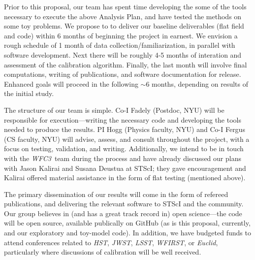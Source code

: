 \documentclass[12pt]{article}
\newcommand{\project}[1]{\textsl{#1}}
\newcommand{\HST}{\project{HST}}
\newcommand{\WFC}{\project{WFC3}}
\begin{document}
Prior to this proposal, our team has spent time developing the some of
the tools necessary to execute the above Analysis Plan, and have tested the
methods on some toy problems.  We propose to to deliver our baseline
deliverables (flat field and code) within 6 months of beginning the
project in earnest.  We envision a rough schedule of 1 month of data
collection/familiarization, in parallel with software development.
Next there will be roughly 4-5 months of interation and assessment of the
calibration algorithm.  Finally, the last month will involve final
computations, writing of publications, and software documentation for
release. Enhanced goals will proceed in the following $\sim6$ months,
depending on results of the initial study.

The structure of our team is simple.  Co-I Fadely (Postdoc, NYU) will
be responsible for execution---writing the necessary code and
developing the tools needed to produce the results.  PI Hogg (Physics
faculty, NYU) and Co-I Fergus (CS faculty, NYU) will advise, assess,
and consult throughout the project, with a focus on testing,
validation, and writing.  Additionally, we intend to be in touch with
the \WFC\ team during the process and have already discussed our plans
with Jason Kalirai and Susana Deustua at STScI; they gave
encouragement and Kalirai offered material assistance in the form of
flat testing (mentioned above).

The primary dissemination of our results will come in the form of
refereed publications, and delivering the relevant software to STScI
and the community.  Our group believes in (and has a great track
record in) open science---the code will be open source, available
publically on GitHub (as is this proposal, currently, and our
exploratory and toy-model code).  In addition, we have budgeted funds
to attend conferences related to \HST, \project{JWST}, \project{LSST},
\project{WFIRST}, or \project{Euclid}, particularly where discussions
of calibration will be well received.


%
%
%
\pasthstusage  %
\end{document}
